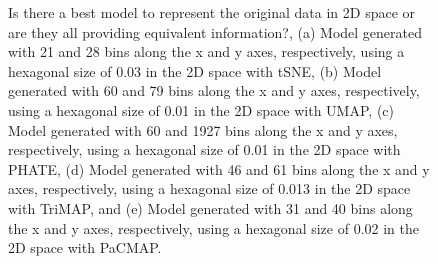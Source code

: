 \documentclass[
  12pt]{article}
\begin{document}
\begin{figure}


\caption{\label{fig-modelfiveGau}Is there a best model to represent the
original data in 2D space or are they all providing equivalent
information?, (a) Model generated with 21 and 28 bins along the x and y
axes, respectively, using a hexagonal size of 0.03 in the 2D space with
tSNE, (b) Model generated with 60 and 79 bins along the x and y axes,
respectively, using a hexagonal size of 0.01 in the 2D space with UMAP,
(c) Model generated with 60 and 1927 bins along the x and y axes,
respectively, using a hexagonal size of 0.01 in the 2D space with PHATE,
(d) Model generated with 46 and 61 bins along the x and y axes,
respectively, using a hexagonal size of 0.013 in the 2D space with
TriMAP, and (e) Model generated with 31 and 40 bins along the x and y
axes, respectively, using a hexagonal size of 0.02 in the 2D space with
PaCMAP.}

\end{figure}%
\end{document}
